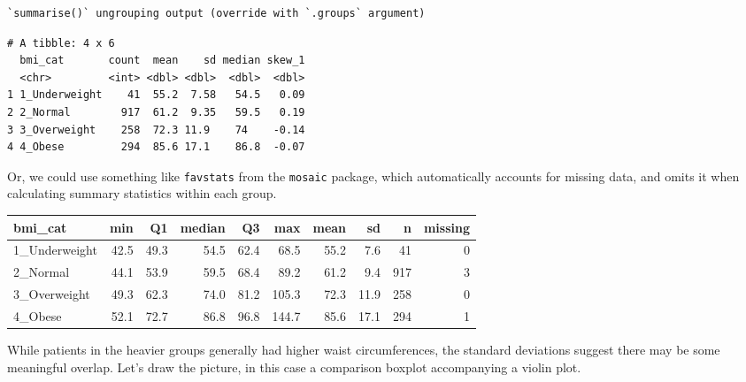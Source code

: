 \documentclass[
]{book}
\newenvironment{Shaded}{\begin{snugshade}}{\end{snugshade}}
\newcommand{\DataTypeTok}[1]{\textcolor[rgb]{0.13,0.29,0.53}{#1}}
\newcommand{\DecValTok}[1]{\textcolor[rgb]{0.00,0.00,0.81}{#1}}
\newcommand{\KeywordTok}[1]{\textcolor[rgb]{0.13,0.29,0.53}{\textbf{#1}}}
\newcommand{\NormalTok}[1]{#1}
\newcommand{\OperatorTok}[1]{\textcolor[rgb]{0.81,0.36,0.00}{\textbf{#1}}}
\newcommand{\StringTok}[1]{\textcolor[rgb]{0.31,0.60,0.02}{#1}}
\begin{document}
\begin{verbatim}
`summarise()` ungrouping output (override with `.groups` argument)
\end{verbatim}

\begin{verbatim}
# A tibble: 4 x 6
  bmi_cat       count  mean    sd median skew_1
  <chr>         <int> <dbl> <dbl>  <dbl>  <dbl>
1 1_Underweight    41  55.2  7.58   54.5   0.09
2 2_Normal        917  61.2  9.35   59.5   0.19
3 3_Overweight    258  72.3 11.9    74    -0.14
4 4_Obese         294  85.6 17.1    86.8  -0.07
\end{verbatim}

Or, we could use something like \texttt{favstats} from the \texttt{mosaic} package, which automatically accounts for missing data, and omits it when calculating summary statistics within each group.

\begin{Shaded}
\end{Shaded}

\begin{tabular}{l|r|r|r|r|r|r|r|r|r}
\hline
bmi\_cat & min & Q1 & median & Q3 & max & mean & sd & n & missing\\
\hline
1\_Underweight & 42.5 & 49.3 & 54.5 & 62.4 & 68.5 & 55.2 & 7.6 & 41 & 0\\
\hline
2\_Normal & 44.1 & 53.9 & 59.5 & 68.4 & 89.2 & 61.2 & 9.4 & 917 & 3\\
\hline
3\_Overweight & 49.3 & 62.3 & 74.0 & 81.2 & 105.3 & 72.3 & 11.9 & 258 & 0\\
\hline
4\_Obese & 52.1 & 72.7 & 86.8 & 96.8 & 144.7 & 85.6 & 17.1 & 294 & 1\\
\hline
\end{tabular}

While patients in the heavier groups generally had higher waist circumferences, the standard deviations suggest there may be some meaningful overlap. Let's draw the picture, in this case a comparison boxplot accompanying a violin plot.
\end{document}
